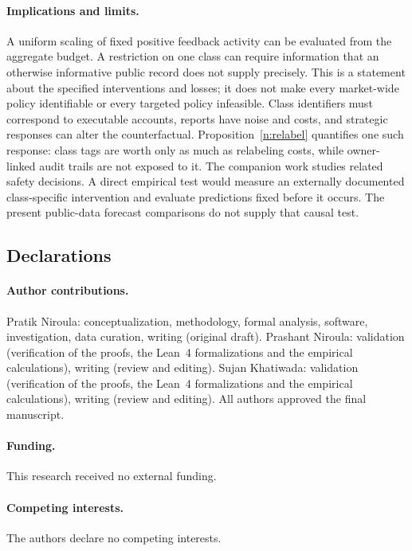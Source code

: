 \documentclass[12pt]{article}
\theoremstyle{definition}
\theoremstyle{remark}
\begin{document}
\paragraph{Implications and limits.} A uniform scaling of fixed positive feedback activity can be evaluated from the aggregate budget. A restriction on one class can require information that an otherwise informative public record does not supply precisely. This is a statement about the specified interventions and losses; it does not make every market-wide policy identifiable or every targeted policy infeasible. Class identifiers must correspond to executable accounts, reports have noise and costs, and strategic responses can alter the counterfactual. Proposition~\ref{n:relabel} quantifies one such response: class tags are worth only as much as relabeling costs, while owner-linked audit trails are not exposed to it. The companion work studies related safety decisions. A direct empirical test would measure an externally documented class-specific intervention and evaluate predictions fixed before it occurs. The present public-data forecast comparisons do not supply that causal test.

\subsection*{Declarations}

\paragraph{Author contributions.} Pratik Niroula: conceptualization, methodology, formal analysis, software, investigation, data curation, writing (original draft). Prashant Niroula: validation (verification of the proofs, the Lean~4 formalizations and the empirical calculations), writing (review and editing). Sujan Khatiwada: validation (verification of the proofs, the Lean~4 formalizations and the empirical calculations), writing (review and editing). All authors approved the final manuscript.

\paragraph{Funding.} This research received no external funding.

\paragraph{Competing interests.} The authors declare no competing interests.
\end{document}
